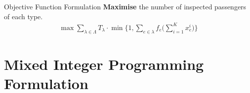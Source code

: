 \documentclass[handout]{beamer}
\begin{document}
\begin{frame}{Objective Function Formulation}
   \textbf{Maximise} the number of inspected passengers of each type.
    \begin{align*}
        \max\sum_{\lambda\in \Lambda}T_{\lambda}\cdot\min\bigg\{1,\sum_{e\in\lambda}f_e\bigg(
            \sum_{i=1}^K x_{e}^{i}
        \bigg)\bigg\}
    \end{align*}
    

\end{frame}



\section{Mixed Integer Programming Formulation}
\end{document}
